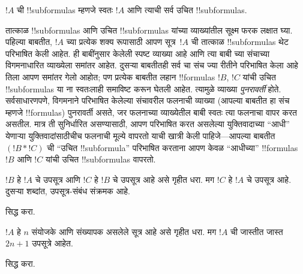 \documentclass[../../../include/open-logic-section]{subfiles}
\begin{document}
\begin{defn}[!!^{subformula}]
$!A$ ची !!{subformula}s म्हणजे स्वतः $!A$ आणि त्याची सर्व उचित
!!{subformula}s.
\end{defn}

\begin{explain}
तात्काळ !!{subformula}s आणि उचित !!{subformula}s यांच्या व्याख्यांतील
सूक्ष्म फरक लक्षात घ्या. पहिल्या बाबतीत, $!A$ च्या प्रत्येक शक्य
रूपासाठी आपण सूत्र~$!A$ ची तात्काळ !!{subformula}s थेट परिभाषित केली
आहेत. ही बाबींनुसार केलेली स्पष्ट व्याख्या आहे आणि त्या बाबी
च्या संचाच्या विगमनाधारित व्याख्येला समांतर आहेत. दुसऱ्या
बाबतीतही सर्व चा संच ज्या रीतीने परिभाषित केला आहे तिला
आपण समांतर गेलो आहोत; पण प्रत्येक बाबतीत लहान !!{formula}s $!B$, $!C$
यांची उचित !!{subformula}s या ना स्वतःलाही समाविष्ट करून
घेतली आहेत.
त्यामुळे व्याख्या \emph{पुनरावर्ती} होते. सर्वसाधारणपणे, विगमनाने
परिभाषित केलेल्या संचावरील फलनाची व्याख्या (आपल्या बाबतीत हा संच म्हणजे
!!{formula}s) पुनरावर्ती असते, जर फलनाच्या व्याख्येतील बाबी स्वतः त्या
फलनाचा वापर करत असतील. मात्र ती सुनिर्धारित असण्यासाठी, आपण परिभाषित
करत असलेल्या युक्तिवादाच्या ``आधी'' येणाऱ्या युक्तिवादांसाठीचीच फलनाची
मूल्ये वापरतो याची खात्री केली पाहिजे---आपल्या बाबतीत $(!B \ast !C)$
ची ``उचित !!{subformula}'' परिभाषित करताना आपण केवळ ``आधीच्या''
!!{formula}s $!B$ आणि $!C$ यांची उचित !!{subformula}s वापरतो.
\end{explain}

\begin{prop}
$!B$ हे $!A$ चे उपसूत्र आणि $!C$ हे $!B$ चे उपसूत्र आहे असे गृहीत धरा.
मग $!C$ हे $!A$ चे उपसूत्र आहे. दुसऱ्या शब्दांत, उपसूत्र-संबंध
संक्रमक आहे.
\end{prop}

\begin{prob}
 सिद्ध करा.
\end{prob}

\begin{prop}
$!A$ हे $n$ संयोजके आणि संख्यापक असलेले सूत्र आहे असे गृहीत धरा.
मग $!A$ ची जास्तीत जास्त $2n+1$ उपसूत्रे आहेत.
\end{prop}

\begin{prob}
 सिद्ध करा.
\end{prob}
\end{document}
